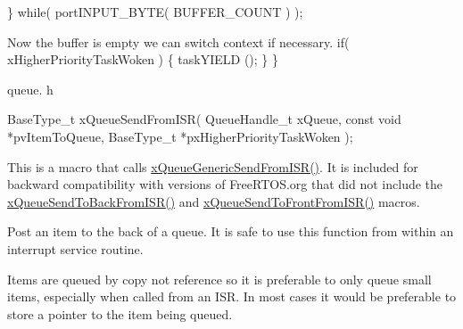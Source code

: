 \begin{DoxyPre}    \} while( portINPUT\_BYTE( BUFFER\_COUNT ) );\end{DoxyPre}



\begin{DoxyPre}Now the buffer is empty we can switch context if necessary.
    if( xHigherPriorityTaskWoken )
    \{
        taskYIELD ();
    \}
 \}
 \end{DoxyPre}


queue. h 
\begin{DoxyPre}
 BaseType\_t xQueueSendFromISR(
                                     QueueHandle\_t xQueue,
                                     const void *pvItemToQueue,
                                     BaseType\_t *pxHigherPriorityTaskWoken
                                );
 \end{DoxyPre}


This is a macro that calls \hyperlink{queue_8h_a263711eb0124112e828a18fd4b8ab29d}{x\-Queue\-Generic\-Send\-From\-I\-S\-R()}. It is included for backward compatibility with versions of Free\-R\-T\-O\-S.\-org that did not include the \hyperlink{queue_8h_a51e9f73417b11441a181cdc4f33a68e9}{x\-Queue\-Send\-To\-Back\-From\-I\-S\-R()} and \hyperlink{queue_8h_af03b83396462affe9e28302660e7b9c6}{x\-Queue\-Send\-To\-Front\-From\-I\-S\-R()} macros.

Post an item to the back of a queue. It is safe to use this function from within an interrupt service routine.

Items are queued by copy not reference so it is preferable to only queue small items, especially when called from an I\-S\-R. In most cases it would be preferable to store a pointer to the item being queued.



